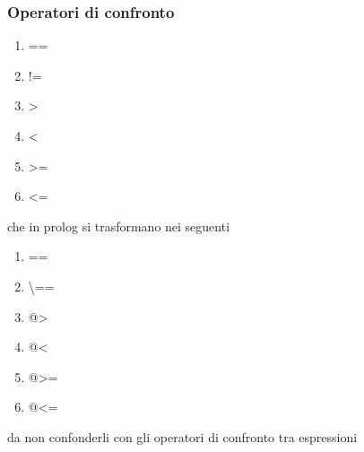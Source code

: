 \subsubsection{Operatori di confronto}
\begin{enumerate}
\item ==
\item !=
\item >
\item <
\item >=
\item <=
\end{enumerate}
che in prolog si trasformano nei seguenti 
\begin{enumerate}
\item ==
\item {\textbackslash}==
\item @>
\item @<
\item @>=
\item @<=
\end{enumerate}
da non confonderli con gli operatori di confronto tra espressioni 

